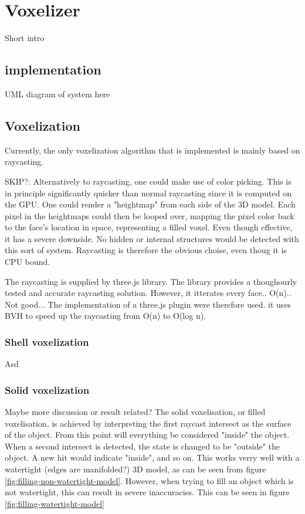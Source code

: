 \section{Voxelizer}
Short intro
\subsection{implementation}
\colorbox{RubineRed}{UML diagram of system here}

\subsection{Voxelization}
Currently, the only voxelization algorithm that is implemented is mainly based on raycasting.

\colorbox{RubineRed}{SKIP?:
Alternatively to raycasting, one could make use of color picking. This is in principle significantly quicker than normal raycasting since it is computed on the GPU. One could render a "heightmap" from each side of the 3D model. Each pixel in the heightmaps could then be looped over, mapping the pixel color back to the face's location in space, representing a filled voxel. Even though effective, it has a severe downside. No hidden or internal structures would be detected with this sort of system. Raycasting is therefore the obvious choise, even thoug it is CPU bound.
}

The raycasting is supplied by three.js library. The library provides a thoughourly tested and accurate raycasting solution. However, it itterates every face.. O(n).. Not good... The implementation of a three.js plugin were therefore used. it uses BVH to speed up the raycasting from O(n) to O(log n).

\subsubsection{Shell voxelization}
Asd

\subsubsection{Solid voxelization}
\colorbox{RubineRed}{Maybe more discussion or result related?}
The solid voxelisation, or filled voxelisation, is achieved by interpreting the first raycast intersect as the surface of the object. From this point will everything be considered "inside" the object. When a second intersect is detected, the state is changed to be "outside" the object. A new hit would indicate "inside", and so on. This works verry well with a watertight (\colorbox{RubineRed}{edges are manifolded?}) 3D model, as can be seen from figure \ref{fig:filling-non-watertight-model}. However, when trying to fill an object which is not watertight, this can result in severe inaccuracies. This can be seen in figure \ref{fig:filling-watertight-model}

